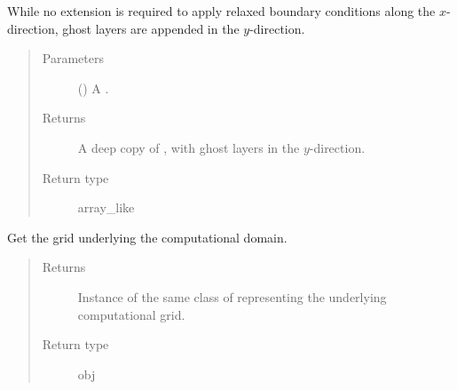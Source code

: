 \documentclass[letterpaper,10pt,english]{sphinxmanual}
\begin{document}
\begin{fulllineitems}

\begin{fulllineitems}
\label{\detokenize{api:dycore.horizontal_boundary_relaxed.RelaxedXZ.from_physical_to_computational_domain}}
While no extension is required to apply relaxed boundary conditions along the \(x\)-direction,
 ghost layers are appended in the \(y\)-direction.
\begin{quote}\begin{description}
\item[{Parameters}] \leavevmode
{} () \textendash{} A .

\item[{Returns}] \leavevmode
A deep copy of , with  ghost layers in the \(y\)-direction.

\item[{Return type}] \leavevmode
array\_like

\end{description}\end{quote}

\end{fulllineitems}


\begin{fulllineitems}
\label{\detokenize{api:dycore.horizontal_boundary_relaxed.RelaxedXZ.get_computational_grid}}
Get the  grid underlying the computational domain.
\begin{quote}\begin{description}
\item[{Returns}] \leavevmode
Instance of the same class of 
representing the underlying computational grid.

\item[{Return type}] \leavevmode
obj

\end{description}\end{quote}


\end{fulllineitems}
\end{fulllineitems}
\end{document}
